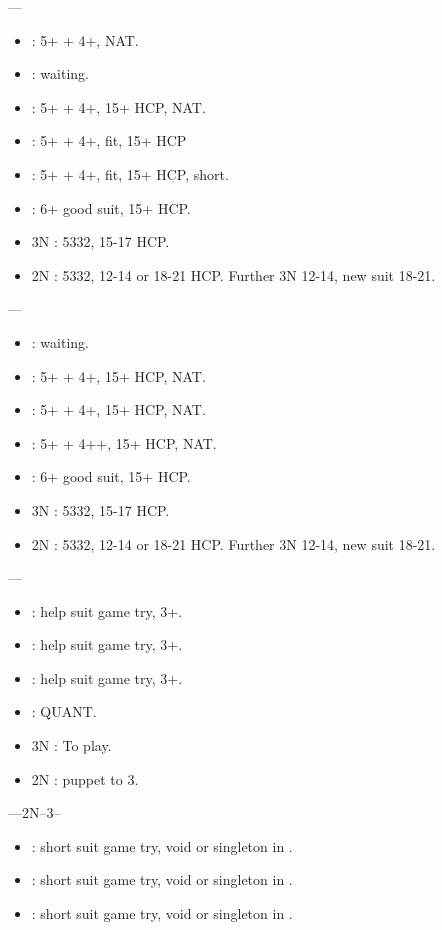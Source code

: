 \documentclass[12pt,twoside,a5paper]{report}%
\begin{document}
	----
	\begin{itemize}
	\renewcommand{\labelitemi}{}
	\item {} : 5+\sp{} + 4+\he{}, NAT.
	\item {} : waiting.
	\item {} : 5+\he{} + 4+\cl{}, 15+ HCP, NAT.
	\item {} : 5+\sp{} + 4+\di{}, fit, 15+ HCP
	\item {} : 5+\sp{} + 4+\di{}, fit, 15+ HCP, short\he{}.
	\item {} : 6+\sp{} good suit, 15+ HCP.
	\item 3N : 5332, 15-17 HCP.
	\item 2N : 5332, 12-14 or 18-21 HCP. Further 3N 12-14, new suit 18-21.
	\end{itemize}

	----
	\begin{itemize}
	\renewcommand{\labelitemi}{}
	\item {} : waiting.
	\item {} : 5+\he{} + 4+\cl{}, 15+ HCP, NAT.
	\item {} : 5+\sp{} + 4+\di{}, 15+ HCP, NAT.
	\item {} : 5+\sp{} + 4+\he{}+, 15+ HCP, NAT.
	\item {} : 6+\sp{} good suit, 15+ HCP.
	\item 3N : 5332, 15-17 HCP.
	\item 2N : 5332, 12-14 or 18-21 HCP. Further 3N 12-14, new suit 18-21.
	\end{itemize}

	----
	\begin{itemize}
	\renewcommand{\labelitemi}{} 
	\item {} : help suit game try, 3+\cl{}.
	\item {} : help suit game try, 3+\di{}.
	\item {} : help suit game try, 3+\he{}.
	\item {} : QUANT.
	\item 3N : To play.
	\item 2N : puppet to 3\cl{}.
	\end{itemize}

	----2N--3\cl{}--
	\begin{itemize}
	\renewcommand{\labelitemi}{}
	\item {} : short suit game try, void or singleton in \di{}.
	\item {} : short suit game try, void or singleton in \he{}.
	\item {} : short suit game try, void or singleton in \cl{}.
	\end{itemize}
\end{document}
